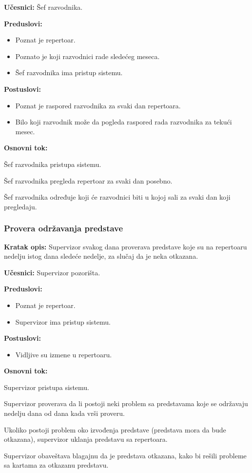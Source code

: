 \documentclass[a4paper]{article}
\begin{document}
\noindent\textbf{Učesnici:} Šef razvodnika.

\noindent\textbf{Preduslovi:}
  \begin{itemize}
    \item Poznat je repertoar.
    \item Poznato je koji razvodnici rade sledećeg meseca.
    \item Šef razvodnika ima pristup sistemu.
  \end{itemize}

\noindent\textbf{Postuslovi:} 
  \begin{itemize}
    \item Poznat je raspored razvodnika za svaki dan repertoara.
    \item Bilo koji razvodnik može da pogleda raspored rada razvodnika za tekući mesec.
  \end{itemize}

\noindent\textbf{Osnovni tok:}
  \begin{legal}
    \item Šef razvodnika pristupa sistemu.
    \item Šef razvodnika pregleda repertoar za svaki dan posebno.
    \item Šef razvodnika određuje koji će razvodnici biti u kojoj sali za svaki dan koji pregledaju.  
  \end{legal}


\subsubsection{Provera održavanja predstave} 
\noindent\textbf{Kratak opis:} Supervizor svakog dana proverava predstave koje su na repertoaru nedelju istog dana sledeće nedelje, za slučaj da je neka otkazana.

\noindent\textbf{Učesnici:} Supervizor pozorišta.

\noindent\textbf{Preduslovi:}
  \begin{itemize}
    \item Poznat je repertoar.
    \item Supervizor ima pristup sistemu.
  \end{itemize}

\noindent\textbf{Postuslovi:} 
  \begin{itemize}
    \item Vidljive su izmene u repertoaru.
  \end{itemize}

\noindent\textbf{Osnovni tok:}
  \begin{legal}
    \item Supervizor pristupa sistemu.
    \item Supervizor proverava da li postoji neki problem sa predstavama koje se održavaju nedelju dana od dana kada vrši proveru.
    \item Ukoliko postoji problem oko izvođenja predstave (predstava mora da bude otkazana), supervizor uklanja predstavu sa repertoara.
    \item Supervizor obaveštava blagajnu da je predstava otkazana, kako bi rešili probleme sa kartama za otkazanu predstavu.
  \end{legal}
\end{document}
